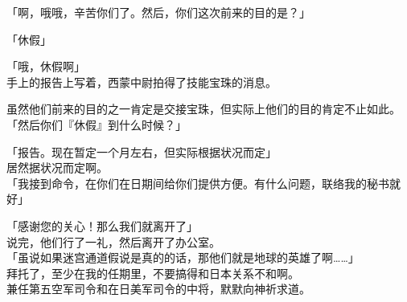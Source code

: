 「啊，哦哦，辛苦你们了。然后，你们这次前来的目的是？」

「休假」

「哦，休假啊」\\

手上的报告上写着，西蒙中尉拍得了技能宝珠的消息。

虽然他们前来的目的之一肯定是交接宝珠，但实际上他们的目的肯定不止如此。\\

「然后你们『休假』到什么时候？」

「报告。现在暂定一个月左右，但实际根据状况而定」\\

居然据状况而定啊。\\

「我接到命令，在你们在日期间给你们提供方便。有什么问题，联络我的秘书就好」

「感谢您的关心！那么我们就离开了」\\

说完，他们行了一礼，然后离开了办公室。\\

「虽说如果迷宫通道假说是真的的话，那他们就是地球的英雄了啊……」\\

拜托了，至少在我的任期里，不要搞得和日本关系不和啊。\\

兼任第五空军司令和在日美军司令的中将，默默向神祈求道。\\
